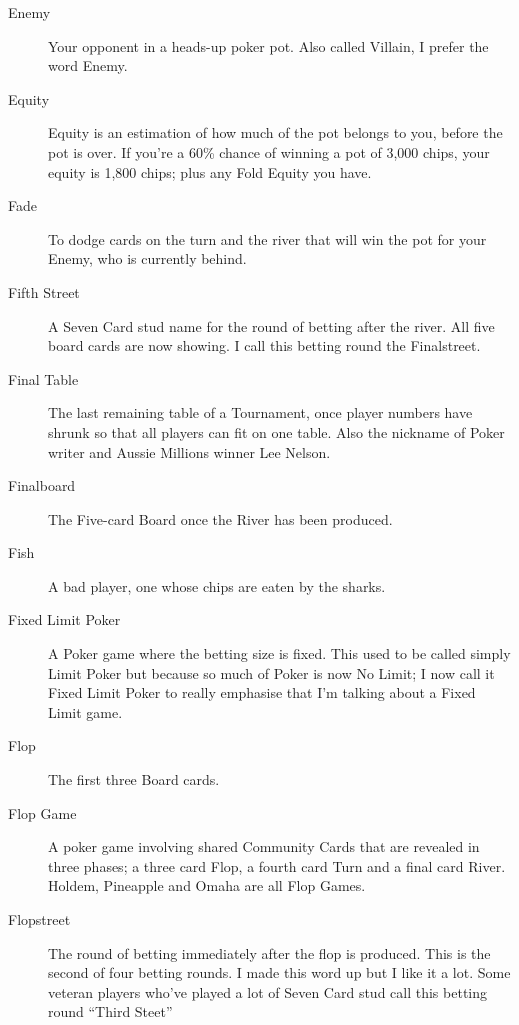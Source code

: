 \begin{description}
\item[Enemy] Your opponent in a heads-up poker pot. Also called
Villain, I prefer the word Enemy.

\item[Equity] Equity is an estimation of how much of the pot belongs
to you, before the pot is over. If you're a 60\% chance of winning a
pot of 3,000 chips, your equity is 1,800 chips; plus any Fold Equity
you have.

\item[Fade] To dodge cards on the turn and the river that will win the
pot for your Enemy, who is currently behind.

\item[Fifth Street] A Seven Card stud name for the round of betting
after the river. All five board cards are now showing. I call this betting
round the Finalstreet.

\item[Final Table] The last remaining table of a Tournament, once
player numbers have shrunk so that all players can fit on one
table. Also the nickname of Poker writer and Aussie Millions winner
Lee Nelson.

\item[Finalboard] The Five-card Board once the River has been
produced.

\item[Fish] A bad player, one whose chips are eaten by the sharks.

\item[Fixed Limit Poker] A Poker game where the betting size is
fixed. This used to be called simply Limit Poker but because so much
of Poker is now No Limit; I now call it Fixed Limit Poker to really
emphasise that I'm talking about a Fixed Limit game.

\item[Flop] The first three Board cards.

\item[Flop Game] A poker game involving shared Community Cards that
are revealed in three phases; a three card Flop, a fourth card Turn
and a final card River. Holdem, Pineapple and Omaha are all Flop
Games.

\item[Flopstreet] The round of betting immediately after the flop is
produced. This is the second of four betting rounds. I made this word
up but I like it a lot. Some veteran players who've played a lot of
Seven Card stud call this betting round ``Third Steet''


\end{description}
